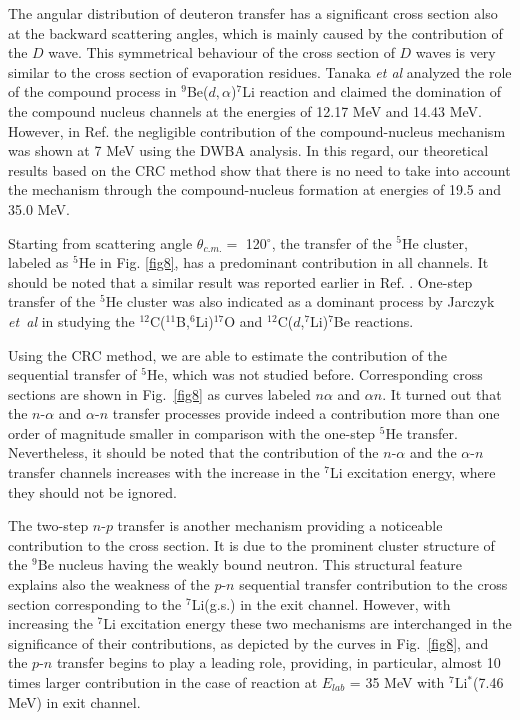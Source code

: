 \documentclass[
11pt, %
english, %
onehalfspacing, %
headsepline, %
]{MastersDoctoralThesis} %
\begin{document}
The angular distribution of deuteron transfer has a significant cross section also at the backward scattering angles, which is mainly caused by the contribution of the $D$ wave. This symmetrical behaviour of the cross section of $D$ waves is very similar to the cross section of evaporation residues. Tanaka \textit{et al} \cite{tanaka1978} analyzed the role of the compound process in ${}^9$Be($d,\alpha$)${}^7$Li reaction and claimed the domination of the compound nucleus channels at the energies of 12.17 MeV and 14.43 MeV. However, in Ref. \cite{bodek1989} the negligible contribution of the compound-nucleus mechanism was shown at 7 MeV using the DWBA analysis. In this regard, our theoretical results based on the CRC method show that there is no need to take into account the mechanism through the compound-nucleus formation at energies of 19.5 and 35.0 MeV.

Starting from scattering angle $\theta_{c.m.} =$ 120$^\circ$, the transfer of the ${}^5$He cluster, labeled as ${}^5$He in Fig. \ref{fig8}, has a predominant contribution in all channels. It should be noted that a similar result was reported earlier in Ref. \cite{bodek1989}. One-step transfer of the ${}^5$He cluster was also indicated as a dominant process by Jarczyk \textit{et~al} \cite{jarczyk1996} in studying the ${}^{12}$C(${}^{11}$B,${}^6$Li)${}^{17}$O and ${}^{12}$C($d$,${}^7$Li)${}^{7}$Be reactions.

Using the CRC method, we are able to estimate the contribution of the sequential transfer of ${}^5$He, which was not studied before. Corresponding cross sections are shown in Fig.~\ref{fig8} as curves labeled $n\alpha$ and $\alpha n$.
It turned out that the $n$-$\alpha$ and $\alpha$-$n$ transfer processes provide indeed a contribution more than one order of magnitude smaller in comparison with the one-step ${}^5$He transfer. Nevertheless, it should be noted that the contribution of the $n$-$\alpha$ and the $\alpha$-$n$ transfer channels increases with the increase in the ${}^7$Li excitation energy, where they should not be ignored.


The two-step $n$-$p$ transfer is another mechanism providing a noticeable contribution to the cross section. It is due to the prominent cluster structure of the ${}^9$Be nucleus having the weakly bound neutron. This structural feature explains also the weakness of the $p$-$n$ sequential transfer contribution to the cross section corresponding to the ${}^7$Li(g.s.) in the exit channel. However, with increasing the ${}^7$Li excitation energy these two mechanisms are interchanged in the significance of their contributions, as depicted by the curves in Fig.~\ref{fig8}, and the $p$-$n$ transfer begins to play a leading role, providing, in particular, almost 10 times larger contribution in the case of reaction at $E_{lab}$ = 35 MeV with ${}^7$Li$^*$(7.46 MeV) in exit channel.
\end{document}
